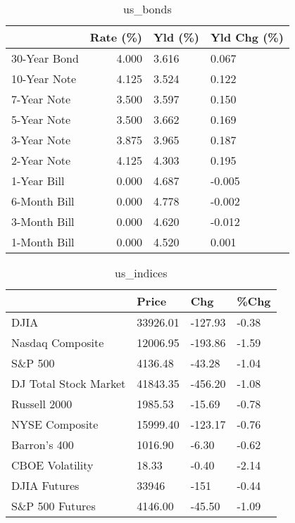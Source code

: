\documentclass{article}%
\begin{document}
\begin{table}[htbp]%
\caption{us\_bonds}%
\centering%
\begin{adjustbox}{width=1\textwidth}%
\begin{tabular}{lrll}
\toprule
             &  Rate (\%) & Yld (\%) & Yld Chg (\%) \\
\midrule
30-Year Bond &     4.000 &   3.616 &       0.067 \\
10-Year Note &     4.125 &   3.524 &       0.122 \\
 7-Year Note &     3.500 &   3.597 &       0.150 \\
 5-Year Note &     3.500 &   3.662 &       0.169 \\
 3-Year Note &     3.875 &   3.965 &       0.187 \\
 2-Year Note &     4.125 &   4.303 &       0.195 \\
 1-Year Bill &     0.000 &   4.687 &      -0.005 \\
6-Month Bill &     0.000 &   4.778 &      -0.002 \\
3-Month Bill &     0.000 &   4.620 &      -0.012 \\
1-Month Bill &     0.000 &   4.520 &       0.001 \\
\bottomrule
\end{tabular}
%
\end{adjustbox}%
\end{table}

%


\begin{table}[htbp]%
\caption{us\_indices}%
\centering%
\begin{adjustbox}{width=1\textwidth}%
\begin{tabular}{llll}
\toprule
                      &    Price &     Chg &  \%Chg \\
\midrule
                 DJIA & 33926.01 & -127.93 & -0.38 \\
     Nasdaq Composite & 12006.95 & -193.86 & -1.59 \\
              S\&P 500 &  4136.48 &  -43.28 & -1.04 \\
DJ Total Stock Market & 41843.35 & -456.20 & -1.08 \\
         Russell 2000 &  1985.53 &  -15.69 & -0.78 \\
       NYSE Composite & 15999.40 & -123.17 & -0.76 \\
         Barron's 400 &  1016.90 &   -6.30 & -0.62 \\
      CBOE Volatility &    18.33 &   -0.40 & -2.14 \\
         DJIA Futures &    33946 &    -151 & -0.44 \\
      S\&P 500 Futures &  4146.00 &  -45.50 & -1.09 \\
\bottomrule
\end{tabular}
%
\end{adjustbox}%
\end{table}
\end{document}
